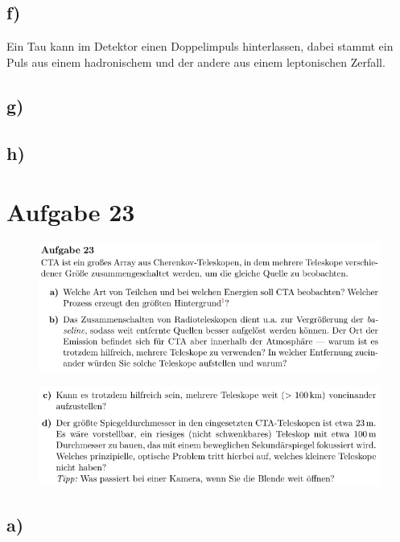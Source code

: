 \subsection{f)}
Ein Tau kann im Detektor einen Doppelimpuls hinterlassen, dabei stammt ein Puls
aus einem hadronischem und der andere aus einem leptonischen Zerfall.

\subsection{g)}

\subsection{h)}

\section{Aufgabe 23}

    \begin{figure}[H]
        \centering
        \includegraphics[width=\textwidth]{images/Aufgabe23a.jpg}
        \label{fig:3}
    \end{figure}

    \begin{figure}[H]
        \centering
        \includegraphics[width=\textwidth]{images/Aufgabe23b.jpg}
        \label{fig:4}
    \end{figure}

\subsection{a)}

